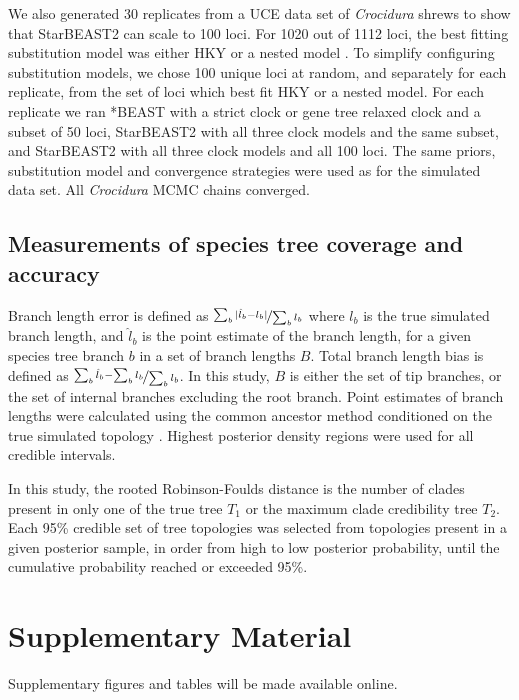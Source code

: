 \documentclass[12pt]{article}
\begin{document}
We also generated 30 replicates from a UCE data set of \textit{Crocidura}
shrews to show that StarBEAST2 can scale to 100 loci. For 1020 out of 1112
loci, the best fitting substitution model was either HKY or a nested model
\citep{Giarla01092015}. To simplify configuring substitution models, we chose
100 unique loci at random, and separately for each replicate, from the set of
loci which best fit HKY or a nested model. For each replicate we ran *BEAST
with a strict clock or gene tree relaxed clock and a subset of 50 loci,
StarBEAST2 with all three clock models and the same subset, and StarBEAST2
with all three clock models and all 100 loci. The same priors, substitution
model and convergence strategies were used as for the simulated data set.
All \textit{Crocidura} MCMC chains converged.

\subsection{Measurements of species tree coverage and accuracy}

Branch length error is defined as $\nicefrac{\sum_b{\lvert\hat{l}_b -
l_b\rvert}}{\sum_b{l_b}}$ where $l_b$ is the true simulated branch length, and
$\hat{l}_b$ is the point estimate of the branch length, for a given species
tree branch $b$ in a set of branch lengths $B$. Total branch length bias is
defined as $\nicefrac{\sum_b{\hat{l}_b} - \sum_b{l_b}}{\sum_b{l_b}}$. In this
study, $B$ is either the set of tip branches, or the set of internal branches
excluding the root branch. Point estimates of branch lengths were calculated
using the common ancestor method conditioned on the true simulated topology
\citep{Heled2013}. Highest posterior density regions were used for all
credible intervals.

In this study, the rooted Robinson-Foulds distance \citep{ROBINSON1981131} is
the number of clades present in only one of the true tree $T_1$ or the maximum
clade credibility tree $T_2$. Each 95\% credible set of tree topologies was
selected from topologies present in a given posterior sample, in order from high
to low posterior probability, until the cumulative probability
reached or exceeded 95\%.

\section{Supplementary Material}

Supplementary figures and tables will be made available online.
\end{document}

